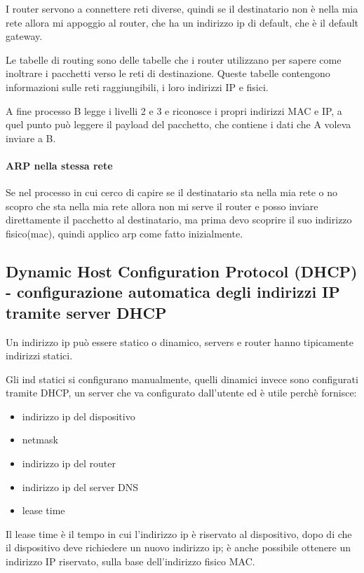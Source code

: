 I router servono a connettere reti diverse, quindi se il destinatario non è nella mia rete allora mi appoggio al router, che ha un indirizzo ip di default, che è il default gateway.

Le tabelle di routing sono delle tabelle che i router utilizzano per sapere come inoltrare i pacchetti verso le reti di destinazione. Queste tabelle contengono informazioni sulle reti raggiungibili, i loro indirizzi IP e fisici.

A fine processo B legge i livelli 2 e 3 e riconosce i propri indirizzi MAC e IP, a quel punto può leggere il payload del pacchetto, che contiene i dati che A voleva inviare a B.

\paragraph{ARP nella stessa rete}
Se nel processo in cui cerco di capire se il destinatario sta nella mia rete o no scopro che sta nella mia rete allora non mi serve il router e posso inviare direttamente il pacchetto al destinatario, ma prima devo scoprire il suo indirizzo fisico(mac), quindi applico arp come fatto inizialmente.

\newpage
\subsection{Dynamic Host Configuration Protocol (DHCP) - configurazione automatica degli indirizzi IP tramite server DHCP}

 Un indirizzo ip può essere statico o dinamico, servers e router hanno tipicamente indirizzi statici.

Gli ind statici si configurano manualmente, quelli dinamici invece sono configurati tramite DHCP, un server che va configurato dall'utente ed è utile perchè fornisce: 
\begin{multicols}{3}
\begin{itemize}
    \item indirizzo ip del dispositivo
    \item netmask
    \item indirizzo ip del router
    \item indirizzo ip del server DNS
    \item lease time
\end{itemize}
\end{multicols}
Il lease time è il tempo in cui l'indirizzo ip è riservato al dispositivo, dopo di che il dispositivo deve richiedere un nuovo indirizzo ip;
è anche possibile ottenere un indirizzo IP riservato, sulla base dell'indirizzo fisico MAC.

